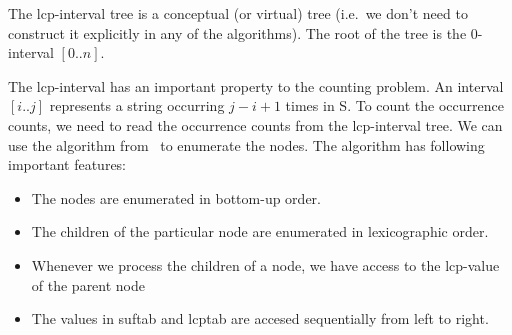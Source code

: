 The lcp-interval tree is a conceptual (or virtual) tree (i.e.\ we don't need to construct it explicitly in any of the algorithms). The root of the tree is the $0$-interval $[0..n]$.

The lcp-interval has an important property to the \kmer counting problem. An interval $[i..j]$ represents a string occurring $j - i + 1$ times in S\cite{tallymer}. To count the \kmer occurrence counts, we need to read the occurrence counts from the lcp-interval tree. We can use the algorithm from~\cite{enhancedsuffixarrays} to enumerate the nodes. The algorithm has following important features:

\begin{itemize}
  \item The nodes are enumerated in bottom-up order.
  \item The children of the particular node are enumerated in lexicographic order.
  \item Whenever we process the children of a node, we have access to the lcp-value of the parent node %
  \item The values in suftab and lcptab are accesed sequentially from left to right.
  \cite{tallymer} %
\end{itemize}


